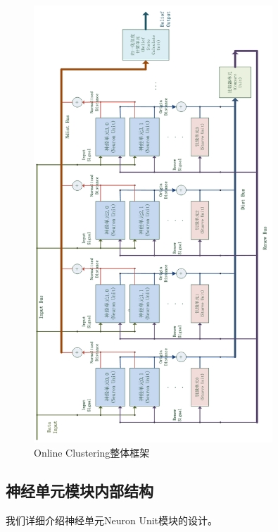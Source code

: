 \begin{figure}[p]
   \centering
   \includegraphics[width=0.8\textwidth]{ClusterStructure.png} %
   \caption{Online Clustering整体框架}
   \label{fig:clusterframe}
\end{figure}

\subsection{神经单元模块内部结构}
我们详细介绍神经单元Neuron Unit模块的设计。

